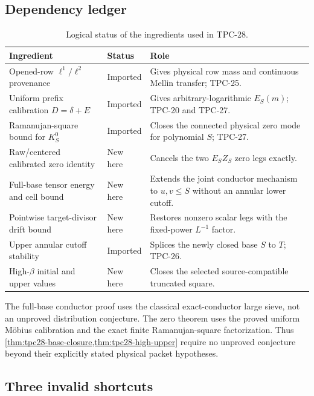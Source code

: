 \subsection{Dependency ledger}

\begin{table}[H]
\centering
\caption{Logical status of the ingredients used in TPC-28.}
\label{tab:tpc28-dependencies}
\begin{tabular}{@{}
 >{\raggedright\arraybackslash}p{}
 >{\raggedright\arraybackslash}p{}
 >{\raggedright\arraybackslash}p{}@{}}
\toprule
Ingredient & Status & Role \\
\midrule
Opened-row $\ell^1/\ell^2$ provenance
& Imported
& Gives physical row mass and continuous Mellin transfer; TPC-25.\\
Uniform prefix calibration $D=\delta+E$
& Imported
& Gives arbitrary-logarithmic $E_S(m)$; TPC-20 and TPC-27.\\
Ramanujan-square bound for $K_S^0$
& Imported
& Closes the connected physical zero mode for polynomial $S$; TPC-27.\\
Raw/centered calibrated zero identity
& New here
& Cancels the two $E_SZ_S$ zero legs exactly.\\
Full-base tensor energy and cell bound
& New here
& Extends the joint conductor mechanism to $u,v\le S$ without an annular lower cutoff.\\
Pointwise target-divisor drift bound
& New here
& Restores nonzero scalar legs with the fixed-power $L^{-1}$ factor.\\
Upper annular cutoff stability
& Imported
& Splices the newly closed base $S$ to $T$; TPC-26.\\
High-$\beta$ initial and upper values
& New here
& Closes the selected source-compatible truncated square.\\
\bottomrule
\end{tabular}
\end{table}

The full-base conductor proof uses the classical exact-conductor large
sieve, not an unproved distribution conjecture.  The zero theorem uses
the proved uniform M\"obius calibration and the exact finite
Ramanujan-square factorization.  Thus
\cref{thm:tpc28-base-closure,thm:tpc28-high-upper} require no unproved
conjecture beyond their explicitly stated physical packet hypotheses.

\subsection{Three invalid shortcuts}

